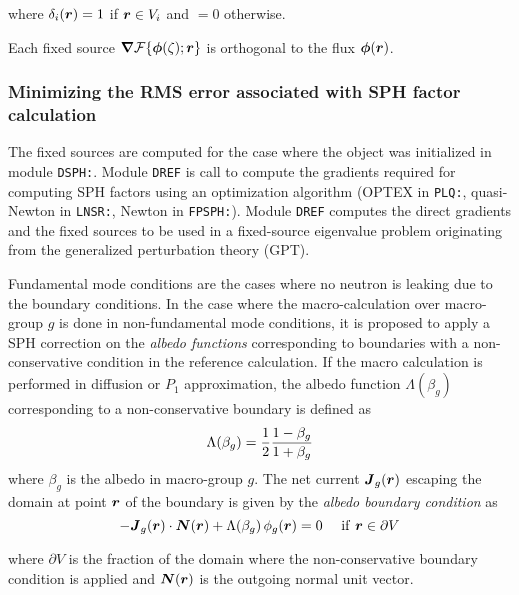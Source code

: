 \noindent where $\delta_i(\bff(r))=1$ if $\bff(r) \in V_i$ and $=0$ otherwise.

\vskip 0.08cm

Each fixed source $\bff(\nabla){\cal F}\{\bff(\phi)(\zeta);\bff(r)\}$ is orthogonal to the flux $\bff(\phi)(\bff(r))$.

\subsubsection{Minimizing the RMS error associated with SPH factor calculation}\label{sect:sph_newton}

The fixed sources are computed for the case where the  object was initialized in module {\tt DSPH:}. Module
{\tt DREF} is call to compute the gradients required for computing SPH factors using an optimization algorithm (OPTEX in
{\tt PLQ:}, quasi-Newton in {\tt LNSR:}, Newton in {\tt FPSPH:}). Module {\tt DREF} computes the direct gradients and the
fixed sources to be used in a fixed-source eigenvalue problem originating from the generalized perturbation theory (GPT).

\vskip 0.08cm

Fundamental mode conditions are the cases where no neutron is leaking due to the boundary conditions. In the case where the macro-calculation over macro-group $g$ is done
in non-fundamental mode conditions, it is proposed to apply a SPH correction
on the {\sl albedo functions} corresponding to boundaries with a non-conservative condition in the reference calculation.\cite{sph2019} If the macro calculation is performed in diffusion
or $P_1$ approximation, the albedo function $\Lambda(\beta_g)$ corresponding to a non-conservative boundary is defined as
\begin{equation}
\Lambda(\beta_g)={1\over 2}{1-\beta_g \over 1+\beta_g}
\label{eq:eq1.6}
\end{equation}
\noindent where $\beta_g$ is the albedo in macro-group $g$. The net current $\bff(J)_g(\bff(r))$ escaping the domain at point $\bff(r)$ of the boundary is given by the {\sl albedo boundary condition} as
\begin{equation}
-\bff(J)_g(\bff(r))\cdot\bff(N)(\bff(r))+\Lambda(\beta_g) \, \phi_g(\bff(r))=0 \ \ \ \ {\rm if} \ \bff(r) \in \partial V
\label{eq:eq1.7}
\end{equation}

\noindent where $\partial V$ is the fraction of the domain where the non-conservative boundary condition is applied and $\bff(N)(\bff(r))$ is the outgoing normal unit vector.

